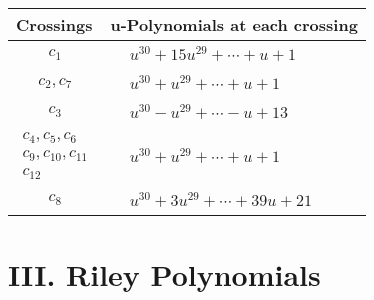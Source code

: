 \documentclass[1p]{elsarticle_modified}
\theoremstyle{definition}
\begin{document}
\begin{tabular}{m{50pt}|m{274pt}}
Crossings & \hspace{64pt}u-Polynomials at each crossing \\
\hline $$\begin{aligned}c_{1}\end{aligned}$$&$\begin{aligned}
&u^{30}+15 u^{29}+\cdots+u+1
\end{aligned}$\\
\hline $$\begin{aligned}c_{2},c_{7}\end{aligned}$$&$\begin{aligned}
&u^{30}+u^{29}+\cdots+u+1
\end{aligned}$\\
\hline $$\begin{aligned}c_{3}\end{aligned}$$&$\begin{aligned}
&u^{30}- u^{29}+\cdots- u+13
\end{aligned}$\\
\hline $$\begin{aligned}c_{4},c_{5},c_{6}\\c_{9},c_{10},c_{11}\\c_{12}\end{aligned}$$&$\begin{aligned}
&u^{30}+u^{29}+\cdots+u+1
\end{aligned}$\\
\hline $$\begin{aligned}c_{8}\end{aligned}$$&$\begin{aligned}
&u^{30}+3 u^{29}+\cdots+39 u+21
\end{aligned}$\\
\hline
\end{tabular}\newpage\renewcommand{\arraystretch}{1}
\centering \section*{ III. Riley Polynomials}
\end{document}
